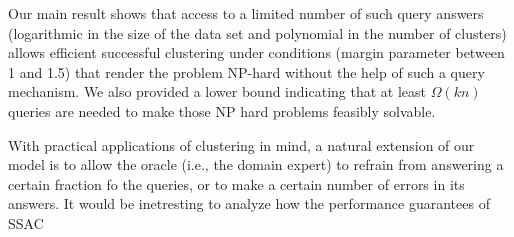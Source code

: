 \documentclass{article}
\begin{document}
Our main result shows that access to a limited number of such query answers (logarithmic in the size of the data set and polynomial in the number of clusters) allows efficient successful clustering under conditions (margin parameter between 1 and 1.5) that render the problem NP-hard without the help of such a query mechanism.  
 We also provided a lower bound indicating that at least $\Omega(kn)$ queries are needed to make those NP hard problems feasibly solvable.

With practical applications of clustering in mind, a natural extension of our model is to allow the oracle (i.e., the domain expert) to refrain from answering a certain fraction fo the queries, or to make a certain number of errors in its answers. It would be inetresting to analyze how the performance guarantees of SSAC 



\end{document}
